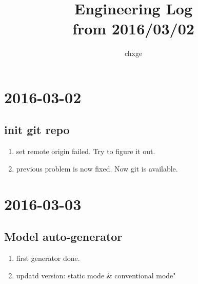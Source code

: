 \documentclass{ctexart}
\begin{document}
\title{%
	Engineering Log\\ \small from 2016/03/02}
\author{%
	chxge}
\maketitle

\tableofcontents
	
\section[03/02]{2016-03-02}
	\subsection{init git repo}
		\begin{enumerate}
			\item <21:11>set remote origin failed. Try to figure it out.
			\item <21:16>previous problem is now fixed. Now git is available.
		\end{enumerate}
\section[03/03]{2016-03-03}
	\subsection{Model auto-generator}
		\begin{enumerate}
			\item <18:55>first generator done.
			\item <19:32>updatd version: static mode & conventional mode"
		\end{enumerate}
\end{document}
